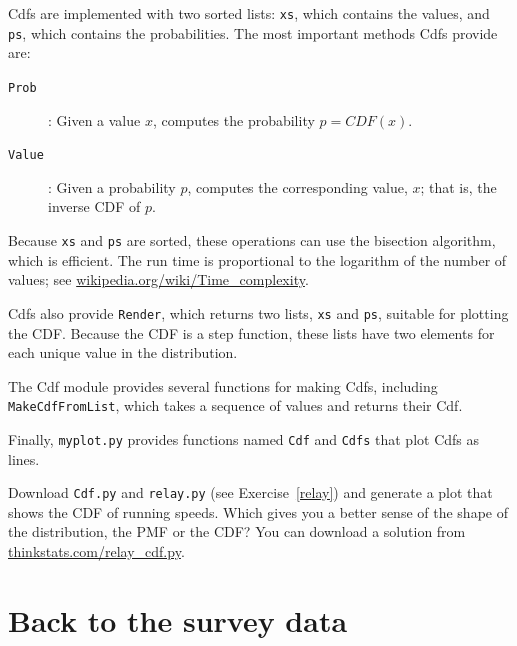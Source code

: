 \documentclass[12pt]{book}
\begin{document}
Cdfs are implemented with two sorted lists: {\tt xs}, which contains
the values, and {\tt ps}, which contains the probabilities.  The
most important methods Cdfs provide are:

\begin{description}

\item[{\tt Prob}]: Given a value $x$, computes the probability $p = CDF(x)$.

\item[{\tt Value}]: Given a probability $p$, computes the
corresponding value, $x$; that is, the inverse CDF of $p$.

\end{description}

Because {\tt xs} and {\tt ps} are sorted, these operations can use the
bisection algorithm, which is efficient.  The run time is proportional
to the logarithm of the number of values; see
\url{wikipedia.org/wiki/Time_complexity}.


Cdfs also provide {\tt Render}, which returns two lists, {\tt xs} and
{\tt ps}, suitable for plotting the CDF.  Because the CDF is a
step function, these lists have two elements for each unique
value in the distribution.

The Cdf module provides several functions for making Cdfs, including
{\tt MakeCdfFromList}, which takes a sequence of values
and returns their Cdf.

Finally, {\tt myplot.py} provides functions named {\tt Cdf} and
{\tt Cdfs} that plot Cdfs as lines.


\begin{exercise}
Download {\tt Cdf.py} and \verb"relay.py" (see
Exercise~\ref{relay}) and generate a plot that shows the CDF of
running speeds.  Which gives you a better sense of the shape of the
distribution, the PMF or the CDF?  You can download a solution
from \url{thinkstats.com/relay_cdf.py}.


\end{exercise}


\section{Back to the survey data}
\label{birth_weights}
\end{document}
